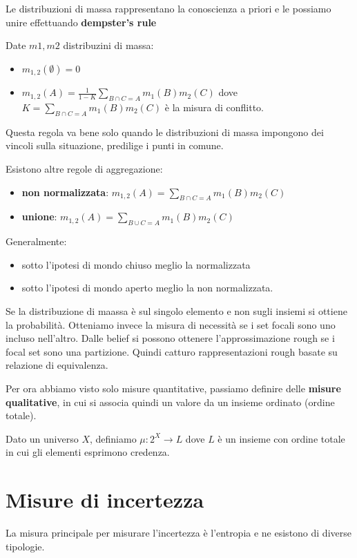 Le distribuzioni di massa rappresentano la conoscienza a priori e le possiamo 
unire effettuando \textbf{dempster's rule}
\begin{definizione}
    Date $m1,m2$ distribuzini di massa:
    \begin{itemize}
        \item $m_{1,2}(\emptyset) = 0$
        \item $m_{1,2} (A) = \frac{1}{1-K}\sum_{B\cap C =A}m_1(B)m_2(C)$
        dove $K =\sum_{B\cap C =A}m_1(B)m_2(C)$ è la misura di conflitto.
    \end{itemize}
\end{definizione}

Questa regola va bene solo quando le distribuzioni di massa impongono dei vincoli
sulla situazione, predilige i punti in comune.

Esistono altre regole di aggregazione:
\begin{itemize}
    \item \textbf{non normalizzata}: $m_{1,2}(A) =\sum_{B\cap C =A}m_1(B)m_2(C)$
    \item \textbf{unione}: $m_{1,2} (A)=\sum_{B\cup C =A}m_1(B)m_2(C)$
\end{itemize}

Generalmente:
\begin{itemize}
    \item sotto l'ipotesi di mondo chiuso meglio la normalizzata
    \item sotto l'ipotesi di mondo aperto meglio la non normalizzata.
\end{itemize}

Se la distribuzione di maassa è sul singolo elemento e non sugli insiemi si ottiene 
la probabilità. Otteniamo invece la misura di necessità se i set focali sono uno incluso nell'altro.
Dalle belief si possono ottenere l'approssimazione rough se i focal set sono una partizione.
Quindi catturo rappresentazioni rough basate su relazione di equivalenza.

Per ora abbiamo visto solo misure quantitative, passiamo definire delle \textbf{misure qualitative}, 
in cui si associa quindi un valore da un insieme ordinato (ordine totale).

Dato un universo $X$, definiamo $\mu:2^X\to L$ dove $L$ è un insieme con ordine 
totale in cui gli elementi esprimono credenza.

\section{Misure di incertezza}
La misura principale per misurare l'incertezza è l'entropia e ne esistono di diverse 
tipologie.

